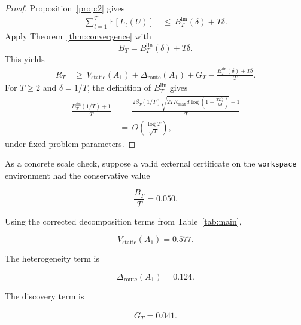 \documentclass{article} %
\begin{document}
\begin{proof}
Proposition~\ref{prop:2} gives
\begin{align}
\label{eq:app-linucb-plugin-proof-tax}
\sum_{t=1}^{T}\mathbb{E}[L_t(U)]
&\,\le\,
B_T^{\mathrm{lin}}(\delta)+T\delta.
\end{align}
Apply Theorem~\ref{thm:convergence} with
\begin{equation}
\label{eq:app-linucb-plugin-proof-b}
B_T
=
B_T^{\mathrm{lin}}(\delta)+T\delta.
\end{equation}
This yields
\begin{align}
\label{eq:app-linucb-plugin-proof-bound}
R_T
&\,\ge\,
V_{\mathrm{static}}(A_1)
+
\Delta_{\mathrm{route}}(A_1)
+
\bar G_T
-
\frac{B_T^{\mathrm{lin}}(\delta)+T\delta}{T}.
\end{align}
For \(T\ge2\) and \(\delta=1/T\), the definition of \(B_T^{\mathrm{lin}}\) gives
\begin{align}
\label{eq:app-linucb-plugin-proof-rate}
\frac{B_T^{\mathrm{lin}}(1/T)+1}{T}
&\,=\,
\frac{
2\beta_T(1/T)
\sqrt{
2T K_{\max}d
\log\!\left(1+\frac{T L_x^2}{\lambda d}\right)
}
+1
}{T}
\\
&\,=\,
O\!\left(\frac{\log T}{\sqrt T}\right),
\end{align}
under fixed problem parameters.
\end{proof}

As a concrete scale check, suppose a valid external certificate on the \texttt{workspace} environment had the conservative value

\begin{equation}
\label{eq:app-workspace-certificate}
\frac{B_T}{T}
=
0.050.
\end{equation}

Using the corrected decomposition terms from Table~\ref{tab:main},

\begin{equation}
\label{eq:app-workspace-static}
V_{\mathrm{static}}(A_1)
=
0.577.
\end{equation}

The heterogeneity term is

\begin{equation}
\label{eq:app-workspace-het}
\Delta_{\mathrm{route}}(A_1)
=
0.124.
\end{equation}

The discovery term is

\begin{equation}
\label{eq:app-workspace-discovery}
\bar G_T
=
0.041.
\end{equation}
\end{document}

